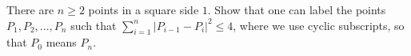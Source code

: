 There are $n \ge 2$ points in a square side $1$. Show that one can label the points $P_1, P_2, ... , P_n$ such that $\sum_{i=1}^n |P_{i-1} - P_i|^2 \le 4$, where we use cyclic subscripts, so that $P_0$ means $P_n$.